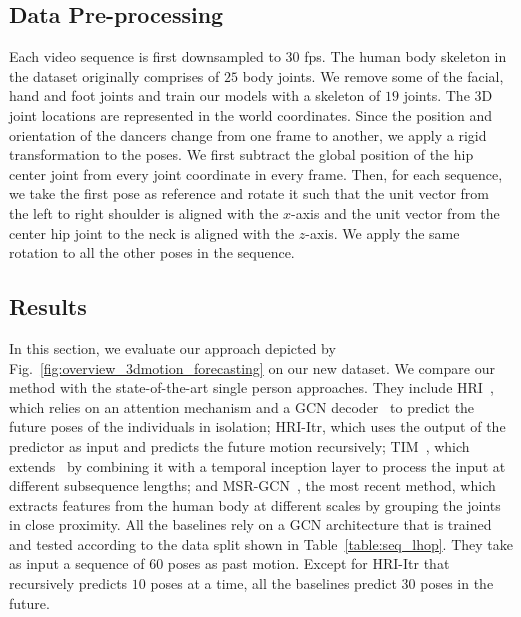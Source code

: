 \subsection{Data Pre-processing}
Each video sequence is first downsampled to 30 fps. The human body skeleton in the \lindyhop{} dataset originally comprises of $25$ body joints. We remove some of the facial, hand and foot joints and train our models with a skeleton of $19$ joints. The 3D joint locations are represented in the world coordinates. Since the position and orientation of the dancers change from one frame to another, we apply a rigid transformation to the poses.  We first subtract the global position of the hip center joint from every joint coordinate in every frame. Then, for each sequence, we take the first pose as  reference and rotate it such that the unit vector from the left to right shoulder is aligned with the $x$-axis and the unit vector from the center hip joint to the neck is aligned with the $z$-axis. We apply the same rotation to all the other poses in the sequence. 

\subsection{Results}

In this section, we evaluate our approach depicted by Fig.~\ref{fig:overview_3dmotion_forecasting} on our new \lindyhop{} dataset. We compare our method with the state-of-the-art single person approaches. They include HRI~\cite{Mao20}, which relies on an attention mechanism and a GCN decoder~\cite{Mao19} to predict the future poses of the individuals in isolation; HRI-Itr, which uses the output of the predictor as input and predicts the future motion recursively; TIM~\cite{Lebailly20}, which extends~\cite{Mao19} by combining it with a temporal inception layer to process the input at different subsequence lengths; and MSR-GCN~\cite{Lingwei21}, the most recent method, which extracts features from the human body at different scales by grouping the joints in close proximity. All the baselines rely on a GCN architecture that is trained and tested according to the data split shown in Table~\ref{table:seq_lhop}. They take as input a sequence of $60$ poses as  past motion. Except for HRI-Itr that recursively predicts $10$ poses at a time, all the baselines predict $30$ poses in the future. 

